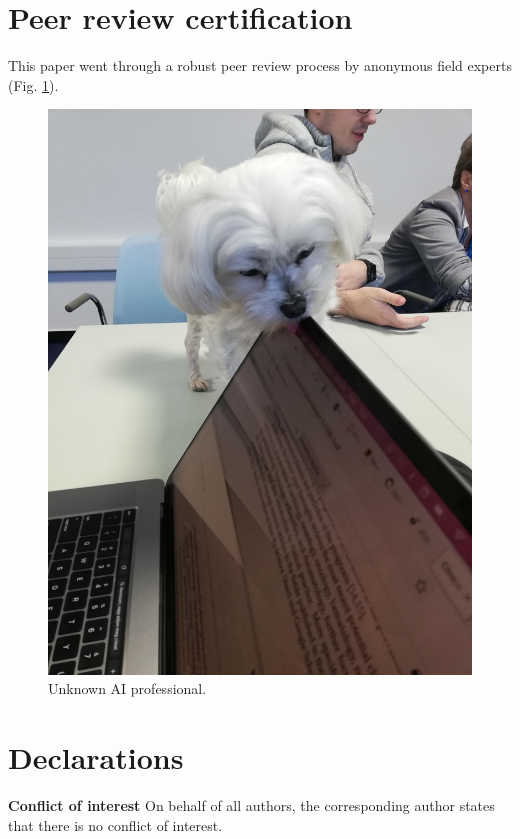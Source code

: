 \documentclass[conference]{IEEEtran}
\begin{document}
\section*{Peer review certification}
This paper went through a robust peer review process by anonymous field experts (Fig. \ref{aiProf}).

\begin{figure}[htbp]
    \begin{center}
    \includegraphics[scale=0.10]{peer_review.png}
    \end{center}
    \caption{Unknown AI professional.}
    \label{aiProf}
\end{figure}

\section*{Declarations}

\textbf{Conflict of interest} On behalf of all authors, the corresponding author
states that there is no conflict of interest.
\end{document}

